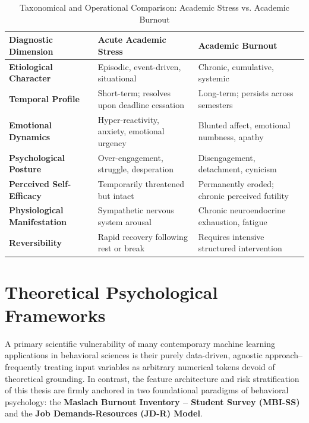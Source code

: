 \documentclass[12pt,a4paper,oneside]{report}
\begin{document}
\begin{table}[H]
\centering
\caption{Taxonomical and Operational Comparison: Academic Stress vs. Academic Burnout}
\label{tab:stress_vs_burnout}
\begin{tabularx}{\textwidth}{p{3.8cm}p{5.5cm}X}
\toprule
\textbf{Diagnostic Dimension} & \textbf{Acute Academic Stress} & \textbf{Academic Burnout} \\
\midrule
\textbf{Etiological Character} & Episodic, event-driven, situational & Chronic, cumulative, systemic \\
\textbf{Temporal Profile} & Short-term; resolves upon deadline cessation & Long-term; persists across semesters \\
\textbf{Emotional Dynamics} & Hyper-reactivity, anxiety, emotional urgency & Blunted affect, emotional numbness, apathy \\
\textbf{Psychological Posture} & Over-engagement, struggle, desperation & Disengagement, detachment, cynicism \\
\textbf{Perceived Self-Efficacy} & Temporarily threatened but intact & Permanently eroded; chronic perceived futility \\
\textbf{Physiological Manifestation} & Sympathetic nervous system arousal & Chronic neuroendocrine exhaustion, fatigue \\
\textbf{Reversibility} & Rapid recovery following rest or break & Requires intensive structured intervention \\
\bottomrule
\end{tabularx}
\end{table}

\section{Theoretical Psychological Frameworks}
\label{sec:theoretical_frameworks}
A primary scientific vulnerability of many contemporary machine learning applications in behavioral sciences is their purely data-driven, agnostic approach--frequently treating input variables as arbitrary numerical tokens devoid of theoretical grounding. In contrast, the feature architecture and risk stratification of this thesis are firmly anchored in two foundational paradigms of behavioral psychology: the \textbf{Maslach Burnout Inventory -- Student Survey (MBI-SS)} and the \textbf{Job Demands-Resources (JD-R) Model}.
\end{document}
